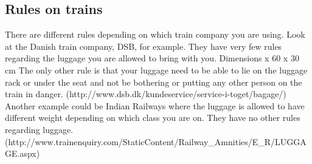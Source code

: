 \subsection{Rules on trains}

There are different rules depending on which train company you are using. 
\newline
Look at the Danish train company, DSB, for example. They have very few rules regarding the luggage you are allowed to bring with you. 
\newline\newline
Dimensions\indent\indent\indent{} x 60 x 30 cm 
\newline\newline
The only other rule is that your luggage need to be able to lie on the luggage rack or under the seat and not be bothering or putting any other person on the train in danger. (http://www.dsb.dk/kundeservice/service-i-toget/bagage/)
\newline\newline
Another example could be Indian Railways where the luggage is allowed to have different weight depending on which class you are on. They have no other rules regarding luggage. (http://www.trainenquiry.com/StaticContent/Railway\_Amnities/E\_R/LUGGAGE.aspx)